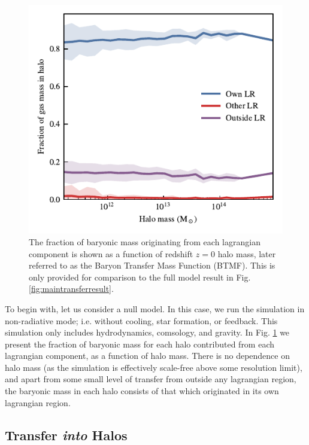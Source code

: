 \begin{figure}
	\centering
	\includegraphics[width=\columnwidth]{figures/s50gadget/component_fraction_vs_halo_mass_gas.pdf}
	\vspace{-0.7cm}
	\caption{
	The fraction of baryonic mass originating from each lagrangian component is
	shown as a function of redshift $z=0$ halo mass, later referred to as the
	Baryon Transfer Mass Function (BTMF). This is only provided for comparison to
	the full model result in Fig. \ref{fig:maintransferresult}.
	}
	\label{fig:nonradiativetransfer}
\end{figure}

To begin with, let us consider a null model. In this case, we run the simulation
in non-radiative mode; i.e. without cooling, star formation, or feedback. This
simulation only includes hydrodynamics, comsology, and gravity. In Fig.
\ref{fig:nonradiativetransfer} we present the fraction of baryonic mass for
each halo contributed from each lagrangian component, as a function of halo
mass. There is no dependence on halo mass (as the simulation is effectively
scale-free above some resolution limit), and apart from some small level of 
transfer from outside any lagrangian region, the baryonic mass in each halo
consists of that which originated in its own lagrangian region.

\subsection{Transfer \emph{into} Halos}

